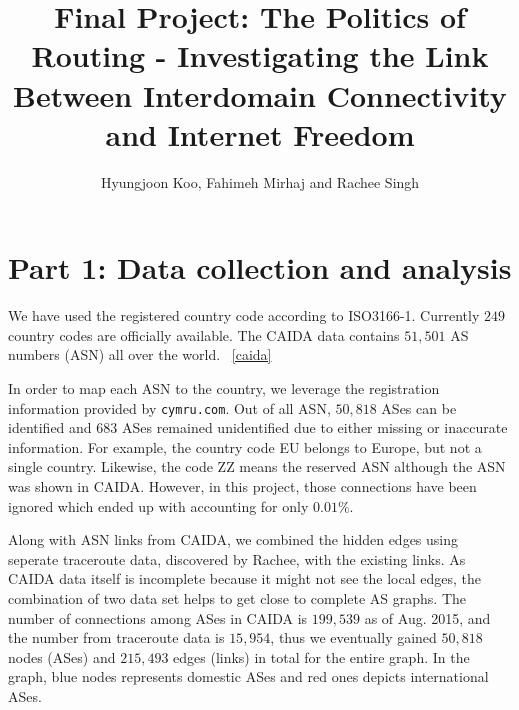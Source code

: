 \documentclass{article}
\begin{document}
\title{Final Project: The Politics of Routing - Investigating the Link Between
Interdomain Connectivity and Internet Freedom}
\author{Hyungjoon Koo, Fahimeh Mirhaj and Rachee Singh}
\maketitle

\section*{Part 1: Data collection and analysis}

\bigskip

\noindent 
We have used the registered country code according to ISO3166-1. Currently $249$
country codes are officially available. The CAIDA data contains $51,501$ AS
numbers (ASN) all over the world. ~\ref{caida}
\bigskip

\noindent 
In order to map each ASN to the country, we leverage the registration
information provided by \texttt{cymru.com}. Out of all ASN, $50,818$ ASes can be
identified and $683$ ASes remained unidentified due to either missing or
inaccurate information. For example, the country code EU belongs to Europe, but
not a single country. Likewise, the code ZZ means the reserved ASN although the
ASN was shown in CAIDA. However, in this project, those connections have been
ignored which ended up with accounting for only $0.01\%$.
\bigskip

\noindent 
Along with ASN links from CAIDA, we combined the hidden edges using seperate
traceroute data, discovered by Rachee, with the existing links. As CAIDA data itself is
incomplete because it might not see the local edges, the combination of two data
set helps to get close to complete AS graphs. The number of connections among
ASes in CAIDA is $199,539$ as of Aug. 2015, and the number from traceroute data 
is $15,954$, thus we eventually gained $50,818$ nodes (ASes) and $215,493$ edges 
(links) in total for the entire graph. In the graph, blue nodes represents 
domestic ASes and red ones depicts international ASes.
\end{document}
